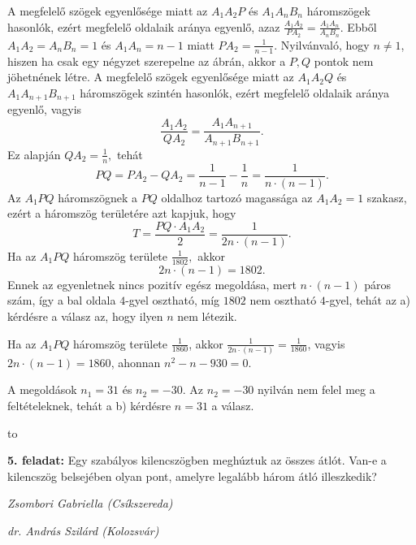 \documentclass[a4paper,10pt]{article}
\newcommand{\ki}[2]{\hfill {\it #1 (#2)}\medskip}
\newcommand{\vonal}{\hbox to \hsize{\hskip2truecm\hrulefill\hskip2truecm}}
\begin{document}
A megfelelő szögek egyenlősége miatt az $A_1A_2P$ és
${A_1}{A_n}{B_n}$ háromszögek hasonlók, ezért megfelelő oldalaik
aránya egyenlő, azaz $\frac{A_1A_2}{PA_2}=\frac{A_1A_n}{A_nB_n}.$
Ebből $A_1A_2=A_nB_n=1$ és $A_1A_n=n-1$ miatt $P{A_2} =
\frac{1}{{n - 1}}.$ Nyilvánvaló, hogy $n \ne 1$, hiszen ha csak egy
négyzet szerepelne az ábrán, akkor a $P,Q$ pontok nem jöhetnének
létre. A megfelelő szögek egyenlősége miatt az ${A_1}{A_2}Q$
és $A_1A_{n+1}B_{n+1}$ háromszögek szintén hasonlók, ezért
megfelelő olda\-la\-ik aránya egyenlő, vagyis
$$\frac{{{A_1}{A_2}}}{{Q{A_2}}} = \frac{{{A_1}{A_{n + 1}}}}{{{A_{n +
1}}{B_{n + 1}}}}.$$ Ez alapján $Q{A_2} = \frac{1}{n},$ tehát
$$PQ = P{A_2} - Q{A_2} = \frac{1}{{n - 1}} - \frac{1}{n} =
\frac{1}{{n \cdot \left( {n - 1} \right)}}.$$ Az ${A_1}PQ$
háromszögnek a $PQ$ oldalhoz tartozó magassága az ${A_1}{A_2} = 1$
szakasz, ezért a háromszög   területére azt kapjuk, hogy
 $$T = \frac{{PQ \cdot {A_1}{A_2}}}{2} = \frac{1}{{2n \cdot \left(
{n - 1} \right)}}.$$ Ha az $A_1PQ$ háromszög területe $\displaystyle
\frac{1}{1802},$ akkor $$2n \cdot \left( {n - 1} \right) = 1802.$$
Ennek az egyenletnek nincs pozitív egész megoldása, mert 
$n \cdot \left( {n - 1} \right)$ páros szám, így a bal oldala
$4$-gyel osztható, míg $1802$ nem osztható $4$-gyel, tehát az a)
kérdésre a válasz az, hogy ilyen $n$ nem létezik.

Ha az ${A_1}PQ$ háromszög területe $\frac{1}{{1860}}$, akkor
$\frac{1}{{2n \cdot \left( {n - 1} \right)}} = \frac{1}{{1860}}$,
vagyis $2n \cdot \left( {n - 1} \right) = 1860$, ahonnan
 ${n^2} - n - 930 = 0.$
 
\newpage 
A megoldások ${n_1} = 31$ és ${n_2} =  - 30.$ Az ${n_2} =  - 30$
nyilván nem felel meg a feltételeknek, tehát a b) kérdésre $n =
31$ a válasz.

\medskip

\vonal

{\bf 5. feladat: } Egy szabályos kilencszögben meghúztuk az összes átlót.
 Van-e a kilencszög belsejében olyan pont, amelyre legalább három átló
 illeszkedik?

\ki{Zsombori Gabriella}{Csíkszereda}

\ki{dr. András Szilárd}{Kolozsvár}\medskip
\end{document}
